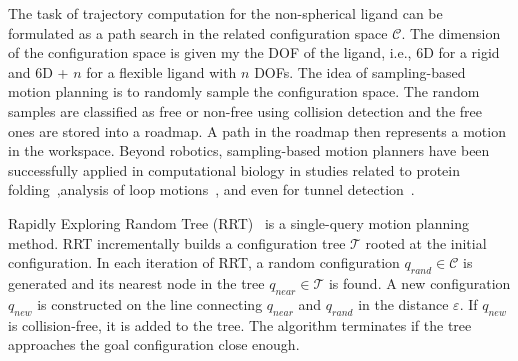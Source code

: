 \documentclass{svmult}
\def\qrand{q_{rand}}
\def\qstart{q_{start}}
\def\qinit{\qstart}
\def\qgoal{\qstart}
\def\qnear{q_{near}}
\def\qnew{q_{new}}
\def\T{\mathcal{T}}
\def\C{\mathcal{C}}
\def\CF{\mathcal{C}_{free}}
\begin{document}
The task of trajectory computation for the non-spherical ligand can be formulated as a path search 
in the related configuration space $\C$.
The dimension of the configuration space is given my the DOF of the ligand, i.e., 6D for a rigid and 6D + $n$ for a flexible
ligand with $n$ DOFs.
The idea of sampling-based motion planning is to randomly sample the configuration space.
The random samples are classified as free or non-free using collision detection and  the free ones are stored into a roadmap.
A path in the roadmap then represents a motion in the workspace.
Beyond robotics, sampling-based motion planners have been successfully applied in computational biology in studies
related to 
protein folding~\cite{al2012motion,gipson2012computational,cortes2010simulating,amato2002using,raveh2009rapid,novinskaya2015improving,songPFintro},analysis of loop motions~\cite{cortes2004geometric}, and even for tunnel detection~\cite{vonasek2016application,vonasek2017tunnel}.

Rapidly Exploring Random Tree (RRT)~\cite{lavalleRRT} is a single-query motion planning method.
RRT incrementally builds a configuration tree $\T$ rooted at the initial configuration.
In each iteration of RRT, a random configuration $\qrand \in \C$ is generated and its nearest node in the tree $\qnear \in \T$ is found.
A new configuration $\qnew$ is constructed on the line connecting $\qnear$ and $\qrand$ in the distance $\varepsilon$.
If $\qnew$ is collision-free, it is added to the tree.
The algorithm terminates if the tree approaches the goal configuration close enough.
\end{document}
